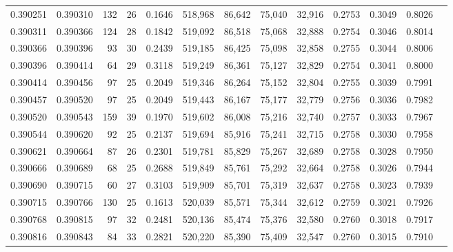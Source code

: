 \begin{tabular}{rrrrrrrrrrrrr}
0.390251 & 0.390310 &   132 &  26 &                                     0.1646 & 518,968 &  86,642 &  75,040 &  32,916 & 0.2753 & 0.3049 & 0.8026 \\
0.390311 & 0.390366 &   124 &  28 &                                     0.1842 & 519,092 &  86,518 &  75,068 &  32,888 & 0.2754 & 0.3046 & 0.8014 \\
0.390366 & 0.390396 &    93 &  30 &                                     0.2439 & 519,185 &  86,425 &  75,098 &  32,858 & 0.2755 & 0.3044 & 0.8006 \\
0.390396 & 0.390414 &    64 &  29 &                                     0.3118 & 519,249 &  86,361 &  75,127 &  32,829 & 0.2754 & 0.3041 & 0.8000 \\
0.390414 & 0.390456 &    97 &  25 &                                     0.2049 & 519,346 &  86,264 &  75,152 &  32,804 & 0.2755 & 0.3039 & 0.7991 \\
0.390457 & 0.390520 &    97 &  25 &                                     0.2049 & 519,443 &  86,167 &  75,177 &  32,779 & 0.2756 & 0.3036 & 0.7982 \\
0.390520 & 0.390543 &   159 &  39 &                                     0.1970 & 519,602 &  86,008 &  75,216 &  32,740 & 0.2757 & 0.3033 & 0.7967 \\
0.390544 & 0.390620 &    92 &  25 &                                     0.2137 & 519,694 &  85,916 &  75,241 &  32,715 & 0.2758 & 0.3030 & 0.7958 \\
0.390621 & 0.390664 &    87 &  26 &                                     0.2301 & 519,781 &  85,829 &  75,267 &  32,689 & 0.2758 & 0.3028 & 0.7950 \\
0.390666 & 0.390689 &    68 &  25 &                                     0.2688 & 519,849 &  85,761 &  75,292 &  32,664 & 0.2758 & 0.3026 & 0.7944 \\
0.390690 & 0.390715 &    60 &  27 &                                     0.3103 & 519,909 &  85,701 &  75,319 &  32,637 & 0.2758 & 0.3023 & 0.7939 \\
0.390715 & 0.390766 &   130 &  25 &                                     0.1613 & 520,039 &  85,571 &  75,344 &  32,612 & 0.2759 & 0.3021 & 0.7926 \\
0.390768 & 0.390815 &    97 &  32 &                                     0.2481 & 520,136 &  85,474 &  75,376 &  32,580 & 0.2760 & 0.3018 & 0.7917 \\
0.390816 & 0.390843 &    84 &  33 &                                     0.2821 & 520,220 &  85,390 &  75,409 &  32,547 & 0.2760 & 0.3015 & 0.7910 \\

\end{tabular}

